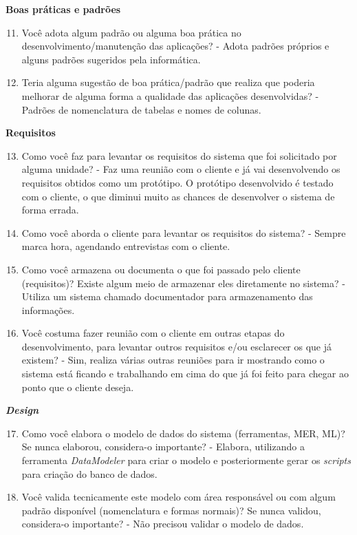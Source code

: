 \begin{apendicesenv}
\textbf{Boas práticas e padrões}

\begin{enumerate}
	\setcounter{enumi}{10}
	\item Você adota algum padrão ou alguma boa prática no desenvolvimento/manutenção das
	aplicações?\newline
	- Adota padrões próprios e alguns padrões sugeridos pela informática.
	\item Teria alguma sugestão de boa prática/padrão que realiza que poderia melhorar de
	alguma forma a qualidade das aplicações desenvolvidas?\newline
	- Padrões de nomenclatura de tabelas e nomes de colunas.
\end{enumerate}

\textbf{Requisitos}

\begin{enumerate}
	\setcounter{enumi}{12}
	\item Como você faz para levantar os requisitos do sistema que foi solicitado por alguma
	unidade?\newline
	- Faz uma reunião com o cliente e já vai desenvolvendo os requisitos obtidos como um protótipo. O protótipo desenvolvido é testado com o cliente, o que diminui muito as chances de desenvolver o sistema de forma errada.
	\item Como você aborda o cliente para levantar os requisitos do sistema?\newline
	- Sempre marca hora, agendando entrevistas com o cliente.
	\item Como você armazena ou documenta o que foi passado pelo cliente (requisitos)? Existe
	algum meio de armazenar eles diretamente no sistema?\newline
	- Utiliza um sistema chamado documentador para armazenamento das informações.
	\item Você costuma fazer reunião com o cliente em outras etapas do desenvolvimento, para
	levantar outros requisitos e/ou esclarecer os que já existem?\newline
	- Sim, realiza várias outras reuniões para ir mostrando como o sistema está ficando e trabalhando em cima do que já foi feito para chegar ao ponto que o cliente deseja.
\end{enumerate}

\textbf{\textit{Design}}

\begin{enumerate}
	\setcounter{enumi}{16}
	\item Como você elabora o modelo de dados do sistema (ferramentas, MER, ML)? Se nunca
	elaborou, considera-o importante?\newline
	- Elabora, utilizando a ferramenta \textit{DataModeler} para criar o modelo e posteriormente gerar os \textit{scripts} para criação do banco de dados.
	\item Você valida tecnicamente este modelo com área responsável ou com algum padrão
	disponível (nomenclatura e formas normais)? Se nunca validou, considera-o importante?\newline
	- Não precisou validar o modelo de dados.
\end{enumerate}


\end{apendicesenv}
